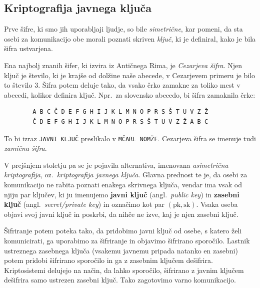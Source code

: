 \documentclass[isrm2, tisk]{fmfdelo}
\begin{document}
\subsection{Kriptografija javnega ključa}
Prve šifre, ki smo jih uporabljaji ljudje, so bile \textit{simetrične}, kar pomeni, da sta osebi 
za komunikacijo obe morali poznati skriven \textit{ključ}, ki je definiral, kako je bila šifra 
ustvarjena. 

\begin{primer}
    Ena najbolj znanih šifer, ki izvira iz Antičnega Rima, je \textit{Cezarjeva šifra}. Njen ključ 
    je število, ki je krajše od dolžine naše abecede, v Cezarjevem primeru je bilo to število $3$.
    Šifra potem deluje tako, da vsako črko zamakne za toliko mest v abecedi, kolikor definira 
    ključ. Npr.\ za slovensko abecedo, bi šifra zamaknila črke:
    \begin{verbatim}
        A B C Č D E F G H I J K L M N O P R S Š T U V Z Ž
        Č D E F G H I J K L M N O P R S Š T U V Z Ž A B C
    \end{verbatim}
    To bi izraz \texttt{JAVNI KLJUČ} preslikalo v \texttt{MČARL NOMŽF}. Cezarjeva šifra se imenuje 
    tudi \textit{zamična šifra}.
\end{primer}

V prejšnjem stoletju pa se je pojavila alternativa, imenovana \textit{asimetrična kriptografija}, oz.\
\textit{kriptografija javnega ključa}. Glavna prednost te je, da osebi za komunikacijo ne rabita 
poznati enakega skrivnega ključa, vendar ima vsak od njiju par ključev, ki ju imenujemo \textbf{javni 
ključ} (angl.\ \textit{public key}) in \textbf{zasebni ključ} (angl.\ \textit{secret/private key}) in 
označimo kot par $(\text{pk}, \text{sk})$. Vsaka oseba objavi svoj javni ključ in poskrbi, da nihče 
ne izve, kaj je njen zasebni ključ. 

Šifriranje potem poteka tako, da pridobimo javni ključ od osebe, s katero želi komunicirati, ga uporabimo
za šifriranje in objavimo šifrirano sporočilo. Lastnik ustreznega zasebnega ključa (vsakemu javnemu pripada 
natanko en zasebni) potem pridobi šifrirano sporočilo in ga z zasebnim ključem dešifrira. Kriptosistemi
delujejo na način, da lahko sporočilo, šifrirano z javnim ključem dešifrira samo ustrezen zasebni ključ.
Tako zagotovimo varno komunikacijo. 
\end{document}
